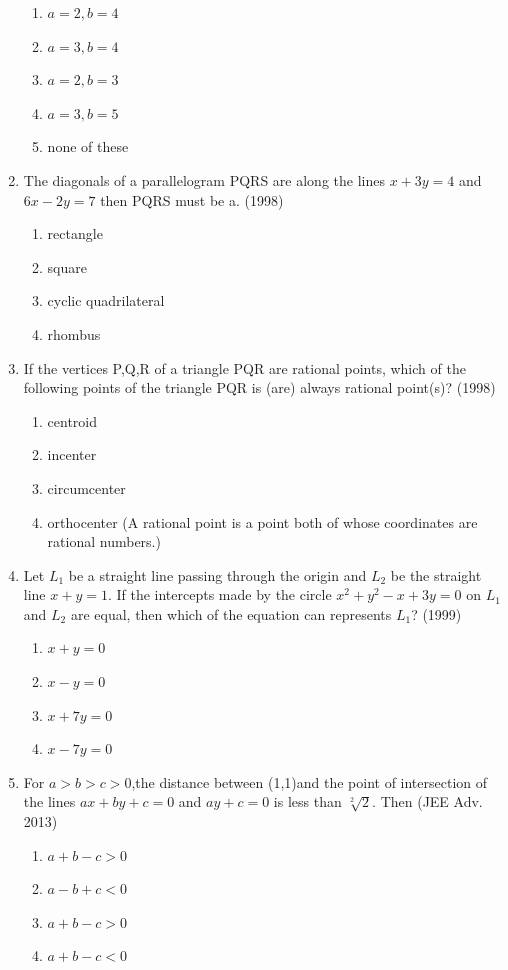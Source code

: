 \documentclass[12pt]{article}
\begin{document}
\begin{enumerate}
\begin{enumerate}
\item $a=2,b=4$
\item $a=3,b=4$ 
\item $a=2,b=3$
\item $a=3,b=5$
\item none of these
\end{enumerate}
\item The diagonals of a parallelogram PQRS are along the lines $x+3y=4$ and $6x-2y=7$ then PQRS must be a. (1998)\\
\begin{enumerate}
\item rectangle
\item square
\item cyclic quadrilateral
\item rhombus
\end{enumerate}
\item If the vertices P,Q,R of a triangle PQR are rational points, which of the following points of the triangle PQR is (are) always rational point(s)? (1998)\\
\begin{enumerate}
\item centroid 
\item incenter
\item circumcenter 
\item orthocenter
(A rational point is a point both of whose coordinates are rational numbers.)
\end{enumerate}
\item  Let $L_1$ be a straight line passing through the origin and $L_2$ be the straight line $x+y=1$. If the intercepts made by the circle $x^2+y^2-x+3y=0$ on $L_1$ and $L_2$ are equal, then which of the equation can represents $L_1$? (1999)\\
\begin{enumerate}
\item $x+y=0$   
\item $x-y=0$ 
\item $x+7y=0$  
\item $x-7y=0$
\end{enumerate}
\item For $a>b>c>0$,the distance between (1,1)and the point of intersection of the lines $ax+by+c=0$ and $ay+c=0$ is less than $\sqrt[2]{2}$. Then (JEE Adv. 2013)\\
\begin{enumerate}
\item $a+b-c>0$ 
\item $a-b+c<0$
\item $a+b-c>0$
\item $a+b-c<0$
\end{enumerate}

\end{enumerate}
\end{document}
